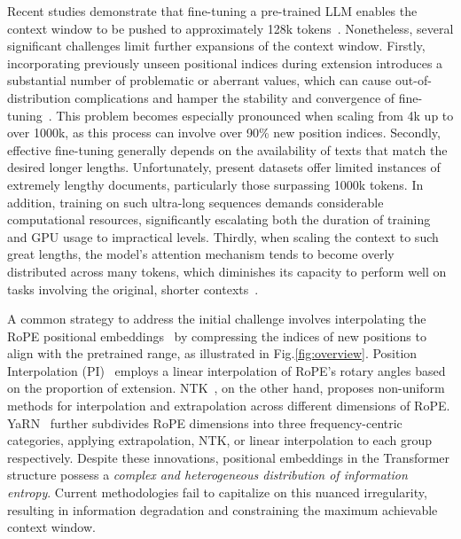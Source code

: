 Recent studies demonstrate that fine-tuning a pre-trained LLM enables the context window to be pushed to approximately 128k tokens~\cite{longlora,pi,yarn,zhang2024soaring,liu2023scaling}. Nonetheless, several significant challenges limit further expansions of the context window. Firstly, incorporating previously unseen positional indices during extension introduces a substantial number of problematic or aberrant values, which can cause out-of-distribution complications and hamper the stability and convergence of fine-tuning~\cite{pi}. This problem becomes especially pronounced when scaling from 4k up to over 1000k, as this process can involve over 90\% new position indices. Secondly, effective fine-tuning generally depends on the availability of texts that match the desired longer lengths. Unfortunately, present datasets offer limited instances of extremely lengthy documents, particularly those surpassing 1000k tokens. In addition, training on such ultra-long sequences demands considerable computational resources, significantly escalating both the duration of training and GPU usage to impractical levels. Thirdly, when scaling the context to such great lengths, the model's attention mechanism tends to become overly distributed across many tokens, which diminishes its capacity to perform well on tasks involving the original, shorter contexts~\cite{pi}.

A common strategy to address the initial challenge involves interpolating the RoPE positional embeddings~\cite{rope,pi} by compressing the indices of new positions to align with the pretrained range, as illustrated in Fig.\ref{fig:overview}. Position Interpolation (PI)~\cite{pi} employs a linear interpolation of RoPE’s rotary angles based on the proportion of extension. NTK~\cite{ntk,dynamicntk}, on the other hand, proposes non-uniform methods for interpolation and extrapolation across different dimensions of RoPE. YaRN~\cite{yarn} further subdivides RoPE dimensions into three frequency-centric categories, applying extrapolation, NTK, or linear interpolation to each group respectively. Despite these innovations, positional embeddings in the Transformer structure possess a \emph{complex and heterogeneous distribution of information entropy}. Current methodologies fail to capitalize on this nuanced irregularity, resulting in information degradation and constraining the maximum achievable context window.

